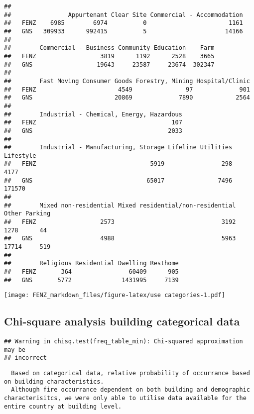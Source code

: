 \documentclass[
]{article}
\begin{document}
\begin{verbatim}
##       
##                Appurtenant Clear Site Commercial - Accommodation
##   FENZ    6985        6974          0                       1161
##   GNS   309933      992415          5                      14166
##       
##        Commercial - Business Community Education    Farm
##   FENZ                  3819      1192      2528    3665
##   GNS                  19643     23587     23674  302347
##       
##        Fast Moving Consumer Goods Forestry, Mining Hospital/Clinic
##   FENZ                       4549               97             901
##   GNS                       20869             7890            2564
##       
##        Industrial - Chemical, Energy, Hazardous
##   FENZ                                      107
##   GNS                                      2033
##       
##        Industrial - Manufacturing, Storage Lifeline Utilities Lifestyle
##   FENZ                                5919                298      4177
##   GNS                                65017               7496    171570
##       
##        Mixed non-residential Mixed residential/non-residential   Other Parking
##   FENZ                  2573                              3192    1278      44
##   GNS                   4988                              5963   17714     519
##       
##        Religious Residential Dwelling Resthome
##   FENZ       364                60409      905
##   GNS       5772              1431995     7139
\end{verbatim}

\texttt{[image: FENZ\_markdown\_files/figure-latex/use categories-1.pdf]}

\hypertarget{chi-square-analysis-building-categorical-data}{%
\subsection{Chi-square analysis building categorical
data}\label{chi-square-analysis-building-categorical-data}}

\begin{verbatim}
## Warning in chisq.test(freq_table_min): Chi-squared approximation may be
## incorrect
\end{verbatim}

\begin{verbatim}
  Based on categorical data, relative probability of occurrance based on building characteristics.  
  Although fire occurrance dependent on both building and demographic characterisitcs, we were only able to utilise data available for the entire country at building level. 
\end{verbatim}
\end{document}
